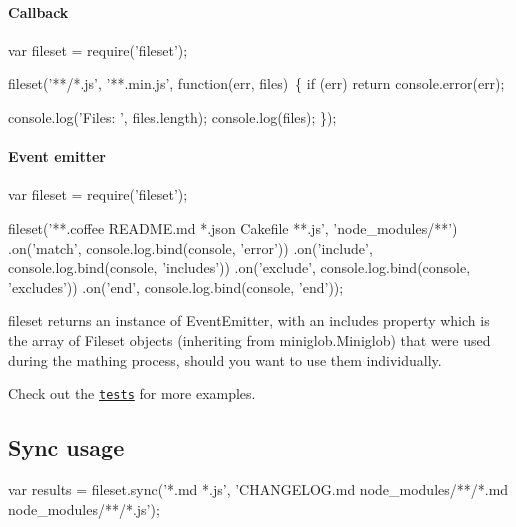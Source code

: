 \paragraph*{Callback}


\begin{DoxyCode}
var fileset = require(\textcolor{stringliteral}{'fileset'});

fileset(\textcolor{stringliteral}{'**/*.js'}, \textcolor{stringliteral}{'**.min.js'}, \textcolor{keyword}{function}(err, files) \{
  \textcolor{keywordflow}{if} (err) \textcolor{keywordflow}{return} console.error(err);

  console.log(\textcolor{stringliteral}{'Files: '}, files.length);
  console.log(files);
\});
\end{DoxyCode}


\paragraph*{Event emitter}


\begin{DoxyCode}
var fileset = require(\textcolor{stringliteral}{'fileset'});

fileset(\textcolor{stringliteral}{'**.coffee README.md *.json Cakefile **.js'}, \textcolor{stringliteral}{'node\_modules/**'})
  .on(\textcolor{stringliteral}{'match'}, console.log.bind(console, \textcolor{stringliteral}{'error'}))
  .on(\textcolor{stringliteral}{'include'}, console.log.bind(console, \textcolor{stringliteral}{'includes'}))
  .on(\textcolor{stringliteral}{'exclude'}, console.log.bind(console, \textcolor{stringliteral}{'excludes'}))
  .on(\textcolor{stringliteral}{'end'}, console.log.bind(console, \textcolor{stringliteral}{'end'}));
\end{DoxyCode}


{\ttfamily fileset} returns an instance of Event\+Emitter, with an {\ttfamily includes} property which is the array of Fileset objects (inheriting from {\ttfamily miniglob.\+Miniglob}) that were used during the mathing process, should you want to use them individually.

Check out the \href{https://github.com/mklabs/node-fileset/tree/master/tests}{\tt tests} for more examples.

\subsection*{Sync usage}


\begin{DoxyCode}
var results = fileset.sync(\textcolor{stringliteral}{'*.md *.js'}, \textcolor{stringliteral}{'CHANGELOG.md node\_modules/**/*.md node\_modules/**/*.js'});
\end{DoxyCode}


